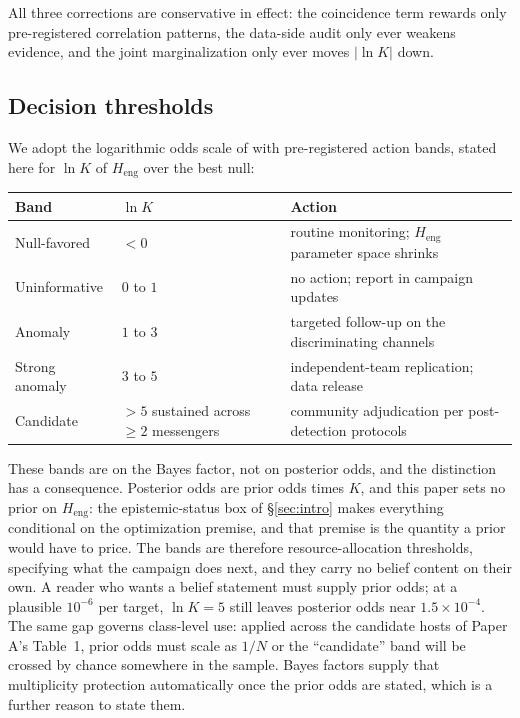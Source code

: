 \documentclass[11pt]{article}
\newcommand{\lnK}{\ensuremath{\ln K}}
\newcommand{\Heng}{\ensuremath{H_{\mathrm{eng}}}}
\begin{document}
All three corrections are conservative in effect: the coincidence term rewards only pre-registered correlation patterns, the data-side audit only ever weakens evidence, and the joint marginalization only ever moves $|\lnK|$ down.

\subsection{Decision thresholds}
\label{sec:thresholds}

We adopt the logarithmic odds scale of \citet{Kass1995} with pre-registered action bands, stated here for \lnK{} of \Heng{} over the best null:
\begin{center}
\small
\begin{tabular}{lll}
\toprule
Band & \lnK & Action \\
\midrule
Null-favored & $< 0$ & routine monitoring; \Heng{} parameter space shrinks \\
Uninformative & $0$ to $1$ & no action; report in campaign updates \\
Anomaly & $1$ to $3$ & targeted follow-up on the discriminating channels \\
Strong anomaly & $3$ to $5$ & independent-team replication; data release \\
Candidate & $> 5$ sustained across $\geq 2$ messengers & community adjudication per post-detection protocols \\
\bottomrule
\end{tabular}
\end{center}
These bands are on the Bayes factor, not on posterior odds, and the distinction has a consequence. Posterior odds are prior odds times $K$, and this paper sets no prior on \Heng: the epistemic-status box of \S\ref{sec:intro} makes everything conditional on the optimization premise, and that premise is the quantity a prior would have to price. The bands are therefore resource-allocation thresholds, specifying what the campaign does next, and they carry no belief content on their own. A reader who wants a belief statement must supply prior odds; at a plausible $10^{-6}$ per target, $\lnK = 5$ still leaves posterior odds near $1.5\times10^{-4}$. The same gap governs class-level use: applied across the candidate hosts of Paper A's Table~1, prior odds must scale as $1/N$ or the ``candidate'' band will be crossed by chance somewhere in the sample. Bayes factors supply that multiplicity protection automatically once the prior odds are stated, which is a further reason to state them.
\end{document}
